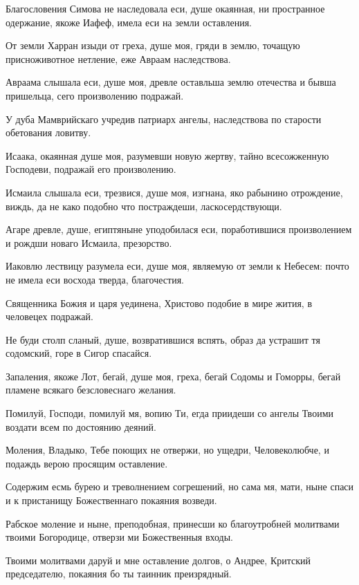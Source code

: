 Благословения Симова не наследовала еси, душе окаянная, ни пространное одержание, якоже Иафеф, имела еси на земли оставления.

От земли Харран изыди от греха, душе моя, гряди в землю, точащую присноживотное нетление, еже Авраам наследствова.

Авраама слышала еси, душе моя, древле оставльша землю отечества и бывша пришельца, сего произволению подражай.

У дуба Мамврийскаго учредив патриарх ангелы, наследствова по старости обетования ловитву.

Исаака, окаянная душе моя, разумевши новую жертву, тайно всесожженную Господеви, подражай его произволению.

Исмаила слышала еси, трезвися, душе моя, изгнана, яко рабынино отрождение, виждь, да не како подобно что постраждеши, ласкосердствующи.

Агаре древле, душе, египтяныне уподобилася еси, поработившися произволением и рождши новаго Исмаила, презорство.

Иаковлю лествицу разумела еси, душе моя, являемую от земли к Небесем: почто не имела еси восхода тверда, благочестия.

Священника Божия и царя уединена, Христово подобие в мире жития, в человецех подражай.

Не буди столп сланый, душе, возвратившися вспять, образ да устрашит тя содомский, горе в Сигор спасайся.

Запаления, якоже Лот, бегай, душе моя, греха, бегай Содомы и Гоморры, бегай пламене всякаго безсловеснаго желания.

Помилуй, Господи, помилуй мя, вопию Ти, егда приидеши со ангелы Твоими воздати всем по достоянию деяний.

Моления, Владыко, Тебе поющих не отвержи, но ущедри, Человеколюбче, и подаждь верою просящим оставление.


Содержим есмь бурею и треволнением согрешений, но сама мя, мати, ныне спаси и к пристанищу Божественнаго покаяния возведи.


Рабское моление и ныне, преподобная, принесши ко благоутробней молитвами твоими Богородице, отверзи ми Божественныя входы.


Твоими молитвами даруй и мне оставление долгов, о Андрее, Критский председателю, покаяния бо ты таинник преизрядный.

